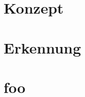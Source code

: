 \section{Konzept}
\label{sec:samplepoint_konzept}

\section{Erkennung}
\label{sec:samplepoint_erkennung}

\section{foo}
\label{sec:samplepoint_foo}
